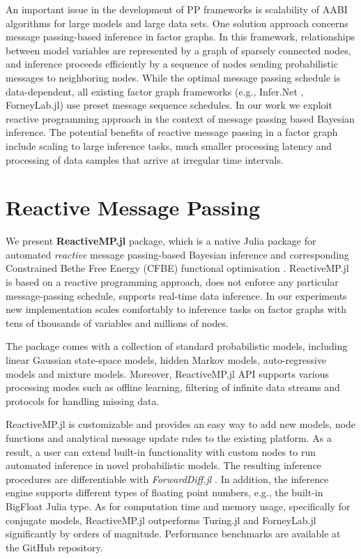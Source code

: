 \documentclass{juliacon}
\begin{document}
An important issue in the development of PP frameworks is scalability of AABI algorithms for large models and large data sets. 
One solution approach concerns message passing-based inference in factor graphs. In this framework, relationships between model variables are represented by a graph of sparsely connected nodes, 
and inference proceeds efficiently by a sequence of nodes sending probabilistic messages to neighboring nodes. While the optimal message passing schedule is data-dependent, 
all existing factor graph frameworks (e.g., Infer.Net \cite{InferNET18}, ForneyLab.jl) use preset message sequence schedules. In our work we exploit reactive programming approach in the context of message passing 
based Bayesian inference. The potential benefits of reactive message passing in a factor graph include 
scaling to large inference tasks, much smaller processing latency and processing of data samples that arrive at irregular time intervals.

\section{Reactive Message Passing}

We present \textbf{ReactiveMP.jl} package, which is a native Julia \cite{bezanson2017julia} package for automated \textit{reactive} message passing-based Bayesian inference and corresponding
Constrained Bethe Free Energy (CFBE) functional optimisation \cite{senoz_local_constraint_2021}. ReactiveMP.jl is based on a reactive programming approach, does not enforce any particular message-passing schedule, 
supports real-time data inference. In our experiments new implementation scales comfortably to inference tasks on factor graphs with tens of thousands of variables and millions of nodes.

The package comes with a collection of standard probabilistic models, including linear Gaussian state-space models, hidden Markov models, auto-regressive models and mixture models. 
Moreover, ReactiveMP.jl API supports various processing modes such as offline learning, filtering of infinite data streams and protocols for handling missing data.

ReactiveMP.jl is customizable and provides an easy way to add new models, node functions and analytical message update rules to the existing platform. 
As a result, a user can extend built-in functionality with custom nodes to run automated inference in novel probabilistic models.
The resulting inference procedures are differentiable with \textit{ForwardDiff.jl} \cite{RevelsLubinPapamarkou2016}. In addition, the inference engine supports different types of floating point numbers, e.g., the built-in BigFloat Julia type.
As for computation time and memory usage, specifically for conjugate models, ReactiveMP.jl outperforms Turing.jl and ForneyLab.jl significantly by orders of magnitude. Performance benchmarks are available at the GitHub repository.
\end{document}
